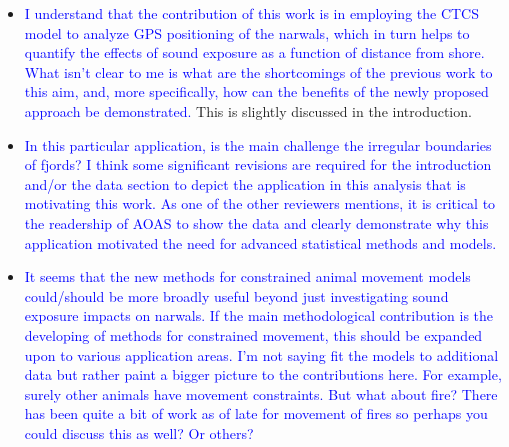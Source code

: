 \documentclass{amsart}
\theoremstyle{plain}
\theoremstyle{remark}
\newcommand {\1}{\mathbb{1}}
\begin{document}
\begin{itemize}
    \item \textcolor{blue}{I understand that the contribution of this work is in employing the CTCS model to analyze
GPS positioning of the narwals, which in turn helps to quantify the effects of sound exposure
as a function of distance from shore. What isn’t clear to me is what are the shortcomings
of the previous work to this aim, and, more specifically, how can the benefits of the newly
proposed approach be demonstrated.} This is slightly discussed in the introduction.

\item \textcolor{blue}{In this particular application, is the main challenge the irregular boundaries of fjords? I think
some significant revisions are required for the introduction and/or the data section to depict
the application in this analysis that is motivating this work. As one of the other reviewers
mentions, it is critical to the readership of AOAS to show the data and clearly demonstrate
why this application motivated the need for advanced statistical methods and models.}

\item \textcolor{blue}{It seems that the new methods for constrained animal movement models could/should be
more broadly useful beyond just investigating sound exposure impacts on narwals. If the
main methodological contribution is the developing of methods for constrained movement,
this should be expanded upon to various application areas. I’m not saying fit the models
to additional data but rather paint a bigger picture to the contributions here. For example,
surely other animals have movement constraints. But what about fire? There has been quite
a bit of work as of late for movement of fires so perhaps you could discuss this as well? Or
others?}
\end{itemize}
\end{document}

